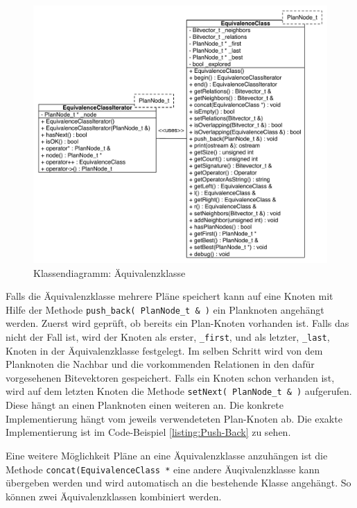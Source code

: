 \begin{figure}[ht]
  \centering
  \includegraphics[width=1\textwidth]{04_Implementierung/ClassEquivalenceClass.pdf}
  \caption{Klassendiagramm: Äquivalenzklasse}
  \label{ClassEquivalenceClass}
\end{figure}


Falls die Äquivalenzklasse mehrere Pläne speichert kann auf eine Knoten mit Hilfe der Methode \texttt{push\_back( PlanNode\_t \& )} ein Planknoten angehängt werden. Zuerst wird geprüft, ob bereits ein Plan-Knoten vorhanden ist. Falls das nicht der Fall ist, wird der Knoten als erster, \texttt{\_first}, und als letzter, \texttt{\_last}, Knoten in der Äquivalenzklasse festgelegt. Im selben Schritt wird von dem Planknoten die Nachbar und die vorkommenden Relationen in den dafür vorgesehenen Bitevektoren gespeichert. Falls ein Knoten schon verhanden ist, wird auf dem letzten Knoten die Methode \texttt{setNext( PlanNode\_t \& )} aufgerufen. Diese hängt an einen Planknoten einen weiteren an. Die konkrete Implementierung hängt vom jeweils verwendeteten Plan-Knoten ab. Die exakte Implementierung ist im Code-Beispiel \ref{listing:Push-Back} zu sehen.

\begin{minipage}{\linewidth}
\linespread{0.5}
\end{minipage}

Eine weitere Möglichkeit Pläne an eine Äquivalenzklasse anzuhängen ist die Methode \texttt{concat(EquivalenceClass *} eine andere Äuqivalenzklasse kann übergeben werden und wird automatisch an die bestehende Klasse angehängt. So können zwei Äquivalenzklassen kombiniert werden.



